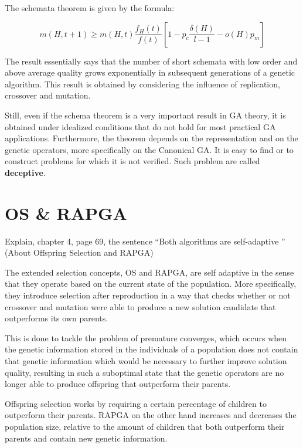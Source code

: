 \documentclass[../main.tex]{subfiles}
\begin{document}
\begin{solution}
The schemata theorem is given by the formula:

\begin{equation}
    m(H,t+1) \geq m(H,t) \frac{f_H(t)}{f(t)} [1 - p_c \frac{\delta(H) }{l-1} - o(H)p_m]
\end{equation}

The result essentially says that the number of short schemata with low order and above average quality grows
exponentially in subsequent generations of a genetic algorithm. This result is obtained by considering the influence of
replication, crossover and mutation.

Still, even if the schema theorem is a very important result in GA theory, it is obtained under idealized conditions
that do not hold for most practical GA applications. Furthermore, the theorem depends on the representation and on the
genetic operators, more specifically on the Canonical GA. It is easy to find or to construct problems for which it is
not verified. Such problem are called \textbf{deceptive}.
\end{solution}

\section{OS \& RAPGA}
\begin{question}
Explain, chapter 4, page 69, the sentence ``Both algorithms are self-adaptive \textellipsis'' (About Offspring
Selection and RAPGA)
\end{question}
\begin{solution}
The extended selection concepts, OS and RAPGA, are self adaptive in the sense that they operate based on the current
state of the population. More specifically, they introduce selection after reproduction in a way that checks whether or
not crossover and mutation were able to produce a new solution candidate that outperforms its own parents.

This is done to tackle the problem of premature converges, which occurs when the  genetic information stored in the
individuals of a population does not contain that genetic information which would be necessary to further improve
solution quality, resulting in such a suboptimal state that the genetic operators are no longer able to produce
offspring that outperform their parents.

Offspring selection works by requiring a certain percentage of children to outperform their parents. RAPGA on the
other hand increases and decreases the population size, relative to the amount of children that both outperform their
parents and contain new genetic information.

\end{solution}
\end{document}
